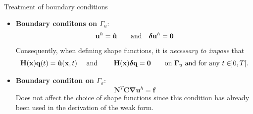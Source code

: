 \documentclass[aspectratio=169]{beamer}
\begin{document}
\begin{frame}{Treatment of boundary conditions}
  \begin{itemize}
    \item \textbf{Boundary conditons on $\Gamma_{u}$}:
          $$\mathbf u^{h}=\mathbf{\hat u}\qquad\mbox{and}\quad\boldsymbol\delta\mathbf u^{h}=\mathbf 0$$
          Consequently, when defining shape functions, it is \emph{necessary to impose} that
          $$\mathbf H(\mathbf x)\mathbf q(t)=\mathbf{\hat u}(\mathbf x,t)\quad\mbox{ and }\qquad \mathbf H(\mathbf x)\boldsymbol\delta\mathbf q=\mathbf 0\qquad \text{on }\mathbf \Gamma_{u} \text{ and for any }t\in]0,T[.$$
    \item \pause \textbf{Boundary conditon on $\Gamma_{\sigma}$}:
          $$\mathbf N^T\mathbf  C\boldsymbol\nabla\mathbf  u^{h}=\mathbf{\hat f}$$
          Does not affect the choice of shape functions since this condition has already been used in the derivation of the weak form.
  \end{itemize}
\end{frame}
\end{document}
